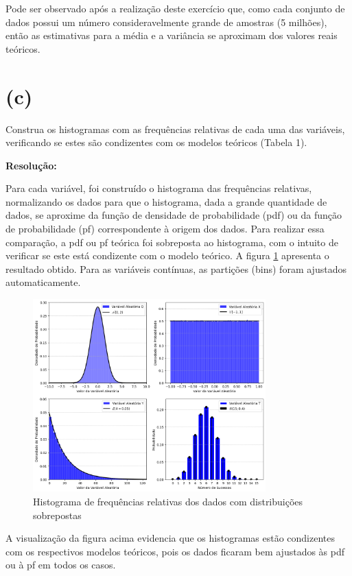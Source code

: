 \documentclass[]{abntex2}
\begin{document}
Pode ser observado após a realização deste exercício que, como cada conjunto de dados possui um número consideravelmente grande de amostras (5 milhões), então as estimativas para a média e a variância se aproximam dos valores reais teóricos.

\section*{\textbf{(c)}}

\noindent Construa os histogramas com as frequências relativas de cada uma das variáveis,
verificando se estes são condizentes com os modelos teóricos (Tabela 1).

\textbf{Resolução:}

Para cada variável, foi construído o histograma das frequências relativas, normalizando os dados para que o histograma, dada a grande quantidade de dados, se aproxime da função de densidade de probabilidade (pdf) ou da função de probabilidade (pf) correspondente à origem dos dados. Para realizar essa comparação, a pdf ou pf teórica foi sobreposta ao histograma, com o intuito de verificar se este está condizente com o modelo teórico. A figura \ref{fig:hist} apresenta o resultado obtido. Para as variáveis contínuas, as partições (bins) foram ajustados automaticamente.

\begin{figure}
    \centering 
    \includegraphics[width=0.8\textwidth]{imgs/hist.png}
    \caption{Histograma de frequências relativas dos dados com distribuições sobrepostas}
    \label{fig:hist} %
\end{figure}

A visualização da figura acima evidencia que os histogramas estão condizentes com os respectivos modelos teóricos, pois os dados ficaram bem ajustados às pdf ou à pf em todos os casos.
\end{document}
